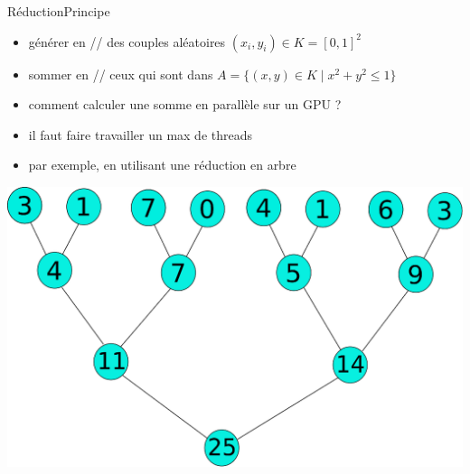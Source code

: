\documentclass[11pt,mathserif]{beamer}
\newcommand{\scout}{\faAngellist}
\newcommand{\galde}{\faQuestion}
\newcommand{\argi}{\faLightbulbO}
\newcommand{\kontuz}{\faExclamationTriangle}
\newcommand{\harritu}{\faExclamation}
\begin{document}
\begin{frame}{Réduction}{Principe}
 \begin{itemize}[<+->]
   \item[\argi] générer en // des couples aléatoires $(x_i,y_i) \in K = [0,1]^2$
   \item[\argi] sommer en // ceux qui sont dans $A = \{ (x,y) \in K \;|\; x^2+y^2 \leqslant 1 \}$
   \item[\galde] comment calculer une somme en parallèle sur un GPU ?
   \item[\kontuz] il faut faire travailler un max de threads \harritu
   \item[\scout] par exemple, en utilisant une réduction en arbre 
  \end{itemize}
\pause
\begin{center}
  \includegraphics[width=0.6\linewidth]{fig/zuhaitz.eps}
\end{center}
\end{frame}
\end{document}
